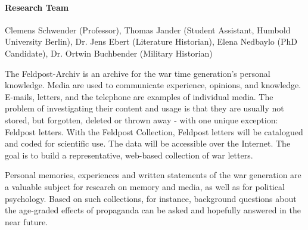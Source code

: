 
\paragraph{Research Team}
Clemens Schwender (Professor), Thomas Jander (Student Assistant, Humbold University Berlin), Dr. Jens Ebert (Literature Historian), Elena Nedbaylo (PhD Candidate), Dr. Ortwin Buchbender (Military Historian)

 The Feldpost-Archiv is an archive for the war time generation's personal knowledge. Media are used to communicate experience, opinions, and knowledge. E-mails, letters, and the telephone are examples of individual media. The problem of investigating their content and usage is that they are usually not stored, but forgotten, deleted or thrown away - with one unique exception: Feldpost letters. With the Feldpost Collection, Feldpost letters will be catalogued and coded for scientific use. The data will be accessible over the Internet. The goal is to build a representative, web-based collection of war letters.

 Personal memories, experiences and written statements of the war generation are a valuable subject for research on memory and media, as well as for political psychology. Based on such collections, for instance, background questions about the age-graded effects of propaganda can be asked and hopefully answered in the near future. 

